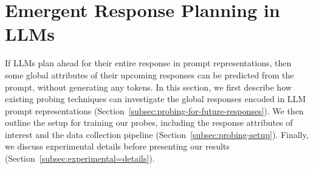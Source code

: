     \section{Emergent Response Planning in LLMs}
    If LLMs plan ahead for their entire response in prompt representations, then some global attributes of their upcoming responses can be predicted from the prompt, without generating any tokens.
    In this section, we first describe how existing probing techniques can investigate the global responses encoded in LLM prompt representations (Section~\ref{subsec:probing-for-future-responses}).
    We then outline the setup for training our probes, including the response attributes of interest and the data collection pipeline (Section~\ref{subsec:probing-setup}).
    Finally, we discuss experimental details before presenting our results (Section~\ref{subsec:experimental=details}).
    
    
